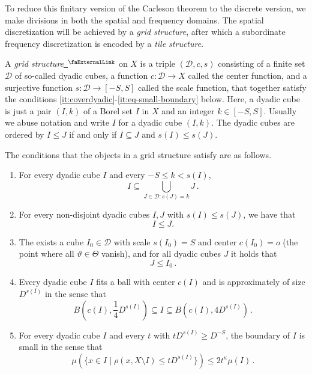 \documentclass[12pt]{amsart}
\newcommand{\extlink}{~\ensuremath{{}^\text{\faExternalLink}}}
\theoremstyle{definition}
\theoremstyle{plain}
\newcommand{\mfa}{{\vartheta}}
\newcommand{\Mf}{{\Theta}}
\begin{document}
To reduce this finitary version of the Carleson theorem to the discrete version, we make divisions in both the spatial and frequency domains. The spatial discretization will be achieved by a \emph{grid structure}, after which a subordinate frequency discretization is encoded by a \emph{tile structure}.

A \emph{grid structure}\href{https://github.com/fpvandoorn/carleson/blob/020d6e5c71d731952eb0379d222eea4049103ca0/Carleson/GridStructure.lean#L20}{\extlink} on $X$ is a triple $(\mathcal{D}, c, s)$ consisting of a finite set $\mathcal{D}$ of so-called dyadic cubes, a function $c\colon \mathcal{D} \to X$ called the center function, and a surjective function $s\colon \mathcal{D} \to [-S, S]$ called the scale function, that together satisfy the conditions \ref{it:coverdyadic}-\ref{it:eq-small-boundary} below. Here, a dyadic cube is just a pair $(I, k)$ of a Borel set $I$ in $X$ and an integer $k \in [-S, S]$. Usually we abuse notation and write $I$ for a dyadic cube $(I, k)$. The dyadic cubes are ordered by $I \le J$ if and only if $I \subseteq J$ and $s(I) \le s(J)$.

The conditions that the objects in a grid structure satisfy are as follows.
\begin{enumerate}[label=\roman*.]
\item \label{it:coverdyadic} For every dyadic cube $I$ and every $-S \leq k < s(I)$,
\begin{equation}
    I\subseteq \bigcup_{J\in \mathcal {D}: s(J)=k}J\, .
\end{equation}
\item \label{it:dyadicproperty} For every non-disjoint dyadic cubes $I, J$ with $s(I) \leq s(J)$, we have that
\begin{equation}
    I\le J.
\end{equation}
\item \label{it:subsetmaxcube} The exists a cube $I_0 \in \mathcal{D}$ with scale $s(I_0) = S$ and center $c(I_0) = o$ (the point where all $\mfa \in \Mf$ vanish), and for all dyadic cubes $J$ it holds that
\begin{equation}\label{subsetmaxcube}
    J \le I_0\,.
\end{equation}
\item \label{it:eq-vol-sp-cube} Every dyadic cube $I$ fits a ball with center $c(I)$ and is approximately of size $D^{s(I)}$ in the sense that
\begin{equation}
    \label{eq-vol-sp-cube}
    B(c(I), \frac{1}{4} D^{s(I)}) \subseteq I \subseteq B(c(I), 4 D^{s(I)})\,.
\end{equation}
\item \label{it:eq-small-boundary} For every dyadic cube $I$ and every $t$ with $t D^{s(I)} \geq D^{-S}$, the boundary of $I$ is small in the sense that
\begin{equation}
    \mu(\{x \in I \mid \rho(x, X \setminus I) \leq t D^{s(I)}\}) \le 2 t^\kappa \mu(I)\,.
\end{equation}
\end{enumerate}
\end{document}
